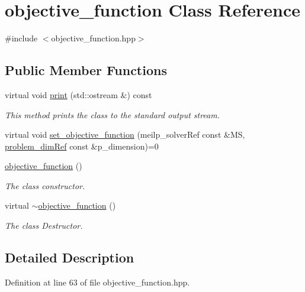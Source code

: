 \hypertarget{classobjective__function}{}\section{objective\+\_\+function Class Reference}
\label{classobjective__function}


{\ttfamily \#include $<$objective\+\_\+function.\+hpp$>$}

\subsection*{Public Member Functions}
\begin{DoxyCompactItemize}
\item 
virtual void \hyperlink{classobjective__function_ab9fc88580b8980fd0c34e17e96a7e308}{print} (std\+::ostream \&) const
\begin{DoxyCompactList}\small\item\em This method prints the class to the standard output stream. \end{DoxyCompactList}\item 
virtual void \hyperlink{classobjective__function_acdfb59b7a754ee183250696c6c55b5ae}{set\+\_\+objective\+\_\+function} (meilp\+\_\+solver\+Ref const \&MS, \hyperlink{problem__dim_8hpp_a812f38fcffc2dd233a75bda8126c9dba}{problem\+\_\+dim\+Ref} const \&p\+\_\+dimension)=0
\item 
\hyperlink{classobjective__function_afaa2f879f6fa344ac73e35d55e6b0e83}{objective\+\_\+function} ()
\begin{DoxyCompactList}\small\item\em The class constructor. \end{DoxyCompactList}\item 
virtual \hyperlink{classobjective__function_afb5e36c983effd86b4f42c2ade3ac73a}{$\sim$objective\+\_\+function} ()
\begin{DoxyCompactList}\small\item\em The class Destructor. \end{DoxyCompactList}\end{DoxyCompactItemize}


\subsection{Detailed Description}


Definition at line 63 of file objective\+\_\+function.\+hpp.



